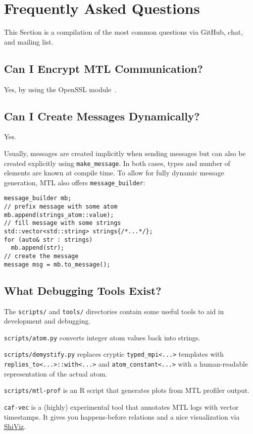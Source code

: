 \section{Frequently Asked Questions}
\label{faq}

This Section is a compilation of the most common questions via GitHub, chat,
and mailing list.

\subsection{Can I Encrypt MTL Communication?}

Yes, by using the OpenSSL module~.

\subsection{Can I Create Messages Dynamically?}

Yes.

Usually, messages are created implicitly when sending messages but can also be
created explicitly using \lstinline^make_message^. In both cases, types and
number of elements are known at compile time. To allow for fully dynamic
message generation, MTL also offers \lstinline^message_builder^:

\begin{lstlisting}
message_builder mb;
// prefix message with some atom
mb.append(strings_atom::value);
// fill message with some strings
std::vector<std::string> strings{/*...*/};
for (auto& str : strings)
  mb.append(str);
// create the message
message msg = mb.to_message();
\end{lstlisting}

\subsection{What Debugging Tools Exist?}

The \lstinline^scripts/^ and \lstinline^tools/^ directories contain some useful
tools to aid in development and debugging.

\lstinline^scripts/atom.py^ converts integer atom values back into strings.

\lstinline^scripts/demystify.py^ replaces cryptic \lstinline^typed_mpi<...>^
templates with \lstinline^replies_to<...>::with<...>^ and
\lstinline^atom_constant<...>^ with a human-readable representation of the
actual atom.

\lstinline^scripts/mtl-prof^ is an R script that generates plots from MTL
profiler output.

\lstinline^caf-vec^ is a (highly) experimental tool that annotates MTL logs
with vector timestamps. It gives you happens-before relations and a nice
visualization via \href{https://bestchai.bitbucket.io/shiviz/}{ShiViz}.
